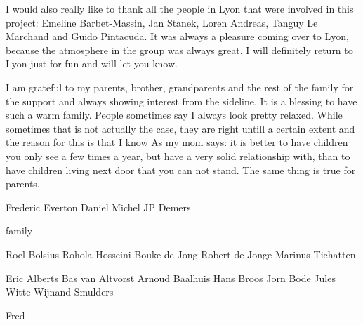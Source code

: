I would also really like to thank all the people in Lyon that were involved in this project: Emeline Barbet-Massin, Jan Stanek, Loren Andreas, Tanguy Le Marchand and Guido Pintacuda. It was always a pleasure coming over to Lyon, because the atmosphere in the group was always great. I will definitely return to Lyon just for fun and will let you know.

I am grateful to my parents, brother, grandparents and the rest of the family for the support and always showing interest from the sideline. It is a blessing to have such a warm family. People sometimes say I always look pretty relaxed. While sometimes that is not actually the case, they are right untill a certain extent and the reason for this is that I know    As my mom says: it is better to have children you only see a few times a year, but have a very solid relationship with, than to have children living next door that you can not stand. The same thing is true for parents.


Frederic
Everton
Daniel
Michel
JP Demers

family

Roel Bolsius
Rohola Hosseini
Bouke de Jong
Robert de Jonge
Marinus Tiehatten

Eric Alberts
Bas van Altvorst
Arnoud Baalhuis
Hans Broos
Jorn Bode
Jules Witte
Wijnand Smulders

Fred